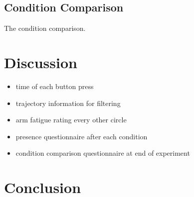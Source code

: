 \subsection{Condition Comparison}
The condition comparison.

\section{Discussion}

\begin{itemize}
  \item time of each button press
  \item trajectory information for filtering
  \item arm fatigue rating every other circle
  \item presence questionnaire after each condition
  \item condition comparison questionnaire at end of experiment
\end{itemize}

\section{Conclusion}

